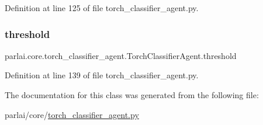 Definition at line 125 of file torch\+\_\+classifier\+\_\+agent.\+py.

\mbox{\label{classparlai_1_1core_1_1torch__classifier__agent_1_1TorchClassifierAgent_aba6e1d0ef53762f5930c271c3ae8d63a}} 
\subsubsection{\texorpdfstring{threshold}{threshold}}
{\footnotesize\ttfamily parlai.\+core.\+torch\+\_\+classifier\+\_\+agent.\+Torch\+Classifier\+Agent.\+threshold}



Definition at line 139 of file torch\+\_\+classifier\+\_\+agent.\+py.



The documentation for this class was generated from the following file\+:\begin{DoxyCompactItemize}
\item 
parlai/core/\hyperlink{torch__classifier__agent_8py}{torch\+\_\+classifier\+\_\+agent.\+py}\end{DoxyCompactItemize}

